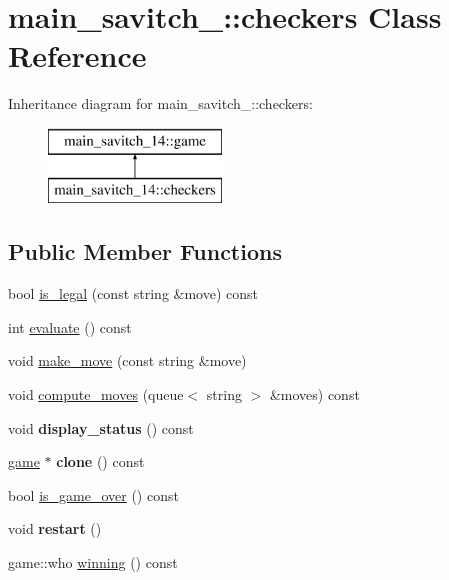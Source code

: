 \hypertarget{classmain__savitch__14_1_1checkers}{}\section{main\+\_\+savitch\+\_\+:\+:checkers Class Reference}
\label{classmain__savitch__14_1_1checkers}
Inheritance diagram for main\+\_\+savitch\+\_\+:\+:checkers\+:\begin{figure}[H]
\begin{center}
\leavevmode
\includegraphics[height=2.000000cm]{classmain__savitch__14_1_1checkers}
\end{center}
\end{figure}
\subsection*{Public Member Functions}
\begin{DoxyCompactItemize}
\item 
bool \hyperlink{classmain__savitch__14_1_1checkers_afc7d56fe1f0637a02cad352e9cda9ee3}{is\+\_\+legal} (const string \&move) const
\item 
int \hyperlink{classmain__savitch__14_1_1checkers_a1705b4e1bfe04205ebb7703925b50f9f}{evaluate} () const
\item 
void \hyperlink{classmain__savitch__14_1_1checkers_a8a08c0555d5b8c264472cc94a2f007e3}{make\+\_\+move} (const string \&move)
\item 
void \hyperlink{classmain__savitch__14_1_1checkers_aa4b4867ee171d04f5473f4ca38a9729a}{compute\+\_\+moves} (queue$<$ string $>$ \&moves) const
\item 
\mbox{\label{classmain__savitch__14_1_1checkers_aa99f69ed300d81b6340f87b59ebba031}} 
void {\bfseries display\+\_\+status} () const
\item 
\mbox{\label{classmain__savitch__14_1_1checkers_a716b963325b1455e63c25afe89d617d9}} 
\hyperlink{classmain__savitch__14_1_1game}{game} $\ast$ {\bfseries clone} () const
\item 
bool \hyperlink{classmain__savitch__14_1_1checkers_ab8481b1a443f4b190d3ff508ab6f62a7}{is\+\_\+game\+\_\+over} () const
\item 
\mbox{\label{classmain__savitch__14_1_1checkers_ad3ee0adbdabda9136ecd46b958c83d24}} 
void {\bfseries restart} ()
\item 
game\+::who \hyperlink{classmain__savitch__14_1_1checkers_aad9a08662e9fdf62752c60997b29370e}{winning} () const
\end{DoxyCompactItemize}
